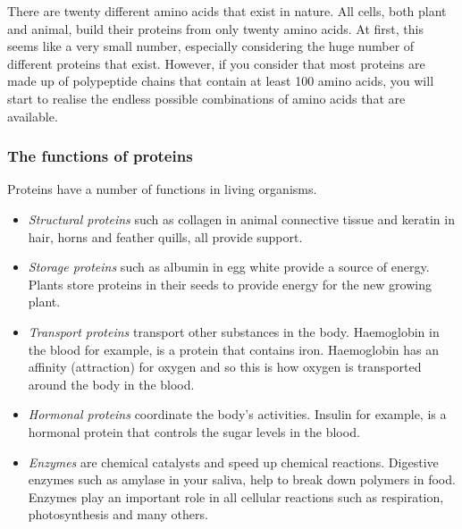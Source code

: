 \begin{IFact}{
There are twenty different amino acids that exist in nature. All cells, both plant and animal, build their proteins from only twenty amino acids. At first, this seems like a very small number, especially considering the huge number of different proteins that exist. However, if you consider that most proteins are made up of polypeptide chains that contain at least 100 amino acids, you will start to realise the endless possible combinations of amino acids that are available. 
}
\end{IFact} 

\subsubsection*{The functions of proteins}

Proteins have a number of functions in living organisms. 

\begin{itemize}
\item{\textit{Structural proteins} such as collagen in animal connective tissue and keratin in hair, horns and feather quills, all provide support.}
\item{\textit{Storage proteins} such as albumin in egg white provide a source of energy. Plants store proteins in their seeds to provide energy for the new growing plant.}
\item{\textit{Transport proteins} transport other substances in the body. Haemoglobin in the blood for example, is a protein that contains iron. Haemoglobin has an affinity (attraction) for oxygen and so this is how oxygen is transported around the body in the blood.}
\item{\textit{Hormonal proteins} coordinate the body's activities. Insulin for example, is a hormonal protein that controls the sugar levels in the blood.}
\item{\textit{Enzymes} are chemical catalysts and speed up chemical reactions. Digestive enzymes such as amylase in your saliva, help to break down polymers in food. Enzymes play an important role in all cellular reactions such as respiration, photosynthesis and many others.} 
\end{itemize}


